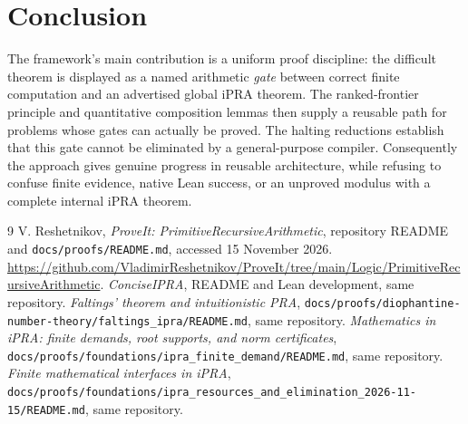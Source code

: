 \documentclass[11pt]{article}
\begin{document}
\section{Conclusion}
The framework's main contribution is a uniform proof discipline: the difficult theorem is displayed as a named arithmetic \emph{gate} between correct finite computation and an advertised global iPRA theorem. The ranked-frontier principle and quantitative composition lemmas then supply a reusable path for problems whose gates can actually be proved. The halting reductions establish that this gate cannot be eliminated by a general-purpose compiler. Consequently the approach gives genuine progress in reusable architecture, while refusing to confuse finite evidence, native Lean success, or an unproved modulus with a complete internal iPRA theorem.
\begin{thebibliography}{9}
 V. Reshetnikov, \emph{ProveIt: PrimitiveRecursiveArithmetic}, repository README and \texttt{docs/proofs/README.md}, accessed 15 November 2026. \url{https://github.com/VladimirReshetnikov/ProveIt/tree/main/Logic/PrimitiveRecursiveArithmetic}.
 \emph{ConciseIPRA}, README and Lean development, same repository.
 \emph{Faltings' theorem and intuitionistic PRA}, \texttt{docs/proofs/diophantine-number-theory/faltings\_ipra/README.md}, same repository.
 \emph{Mathematics in iPRA: finite demands, root supports, and norm certificates}, \texttt{docs/proofs/foundations/ipra\_finite\_demand/README.md}, same repository.
 \emph{Finite mathematical interfaces in iPRA}, \texttt{docs/proofs/foundations/ipra\_resources\_and\_elimination\_2026-11-15/README.md}, same repository.
\end{thebibliography}
\end{document}
